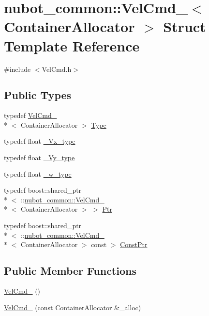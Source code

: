\hypertarget{structnubot__common_1_1VelCmd__}{\section{nubot\-\_\-common\-:\-:Vel\-Cmd\-\_\-$<$ Container\-Allocator $>$ Struct Template Reference}
\label{structnubot__common_1_1VelCmd__}
}


{\ttfamily \#include $<$Vel\-Cmd.\-h$>$}

\subsection*{Public Types}
\begin{DoxyCompactItemize}
\item 
typedef \hyperlink{structnubot__common_1_1VelCmd__}{Vel\-Cmd\-\_\-}\\*
$<$ Container\-Allocator $>$ \hyperlink{structnubot__common_1_1VelCmd___a6986d19cbdcd3c0bb75e68ffea5b7886}{Type}
\item 
typedef float \hyperlink{structnubot__common_1_1VelCmd___a2c1ee6d1985c76294e058cd55ed98346}{\-\_\-\-Vx\-\_\-type}
\item 
typedef float \hyperlink{structnubot__common_1_1VelCmd___af99ccc1753b4650b4beb815e54d28d1f}{\-\_\-\-Vy\-\_\-type}
\item 
typedef float \hyperlink{structnubot__common_1_1VelCmd___a3fae7dd67651497537f5eb1bde85d6cb}{\-\_\-w\-\_\-type}
\item 
typedef boost\-::shared\-\_\-ptr\\*
$<$ \-::\hyperlink{structnubot__common_1_1VelCmd__}{nubot\-\_\-common\-::\-Vel\-Cmd\-\_\-}\\*
$<$ Container\-Allocator $>$ $>$ \hyperlink{structnubot__common_1_1VelCmd___a860a08539c646e06eb0cc72688531edc}{Ptr}
\item 
typedef boost\-::shared\-\_\-ptr\\*
$<$ \-::\hyperlink{structnubot__common_1_1VelCmd__}{nubot\-\_\-common\-::\-Vel\-Cmd\-\_\-}\\*
$<$ Container\-Allocator $>$ const  $>$ \hyperlink{structnubot__common_1_1VelCmd___a5a57f1d76c9209090962bf805a6d8cc8}{Const\-Ptr}
\end{DoxyCompactItemize}
\subsection*{Public Member Functions}
\begin{DoxyCompactItemize}
\item 
\hyperlink{structnubot__common_1_1VelCmd___a5736970ddf0bfb30bebf848b190c232a}{Vel\-Cmd\-\_\-} ()
\item 
\hyperlink{structnubot__common_1_1VelCmd___a6e93020541bdc775543ca8e2e74cbdb8}{Vel\-Cmd\-\_\-} (const Container\-Allocator \&\-\_\-alloc)
\end{DoxyCompactItemize}
